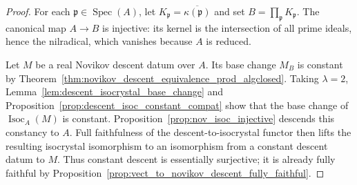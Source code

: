 \begin{proof}
  \leanok
  For each $\mathfrak p\in\operatorname{Spec}(A)$, let
  $K_{\mathfrak p}=\overline{\kappa(\mathfrak p)}$ and set
  $B=\prod_{\mathfrak p}K_{\mathfrak p}$. The canonical map $A\to B$ is
  injective: its kernel is the intersection of all prime ideals, hence the
  nilradical, which vanishes because $A$ is reduced.

  Let $M$ be a real Novikov descent datum over $A$. Its base change $M_B$ is
  constant by Theorem~\ref{thm:novikov_descent_equivalence_prod_algclosed}.
  Taking $\lambda=2$, Lemma~\ref{lem:descent_isocrystal_base_change} and
  Proposition~\ref{prop:descent_isoc_constant_compat} show that the base change
  of $\operatorname{Isoc}_A(M)$ is constant. Proposition~\ref{prop:nov_isoc_injective}
  descends this constancy to $A$. Full faithfulness of the descent-to-isocrystal
  functor then lifts the resulting isocrystal isomorphism to an isomorphism from
  a constant descent datum to $M$. Thus constant descent is essentially
  surjective; it is already fully faithful by
  Proposition~\ref{prop:vect_to_novikov_descent_fully_faithful}.
\end{proof}
